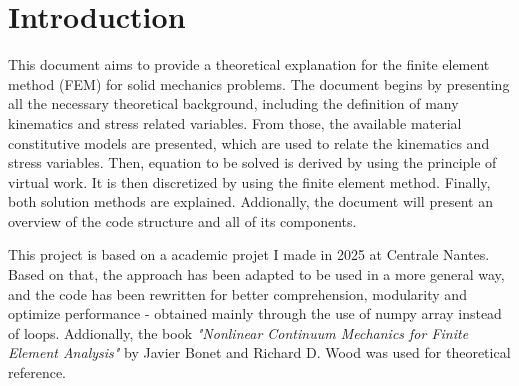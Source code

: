 \chapter{Introduction}

This document aims to provide a theoretical explanation for the finite element method (FEM) for solid mechanics problems. The document begins by presenting all the necessary theoretical background, including the definition of many kinematics and stress related variables. From those, the available material constitutive models are presented, which are used to relate the kinematics and stress variables. Then, equation to be solved is derived by using the principle of virtual work. It is then discretized by using the finite element method. Finally, both solution methods are explained. Addionally, the document will present an overview of the code structure and all of its components.

This project is based on a academic projet I made in 2025 at Centrale Nantes. Based on that, the approach has been adapted to be used in a more general way, and the code has been rewritten for better comprehension, modularity and optimize performance - obtained mainly through the use of numpy array instead of loops. Addionally, the book \textit{"Nonlinear Continuum Mechanics for Finite Element Analysis"} by Javier Bonet and Richard D. Wood was used for theoretical reference.
